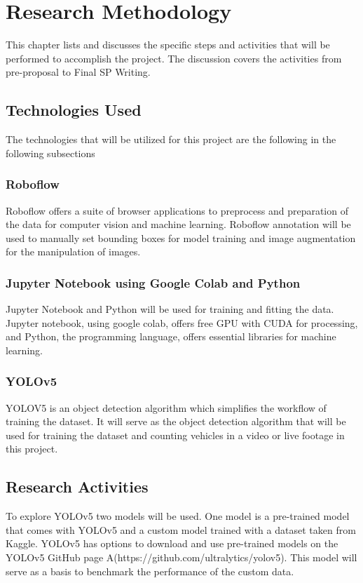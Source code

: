 \chapter{Research Methodology}
This chapter lists and discusses the specific steps and activities that will be performed  to accomplish the project. 
The discussion covers the activities from pre-proposal to Final SP Writing.

\section{Technologies Used}
The technologies that will be utilized for this project are the following in the following subsections

\subsection{Roboflow}
Roboflow offers a suite  of browser applications to preprocess and preparation of the data for computer vision and machine learning. Roboflow annotation will be used  to manually set bounding boxes for model training and image augmentation for the manipulation of images. 

\subsection{Jupyter Notebook using Google Colab and Python}
Jupyter Notebook and Python will be used for training and fitting the data. Jupyter notebook, using google colab,  offers free GPU with CUDA for processing, and Python, the programming language, offers essential libraries for machine learning.

\subsection{YOLOv5}
 YOLOV5 is an object detection algorithm which simplifies the workflow of training the dataset. It will serve as the object detection algorithm that will be used for training the dataset and counting vehicles in a video or live footage in this project.

\section{Research Activities}
To explore YOLOv5 two models will be used. One model is a pre-trained model that comes with YOLOv5 and a custom model trained with a dataset taken from Kaggle. YOLOv5 has options to download and use pre-trained models on the YOLOv5 GitHub page A(https://github.com/ultralytics/yolov5). This model will serve as a basis to benchmark the performance of the custom data.

